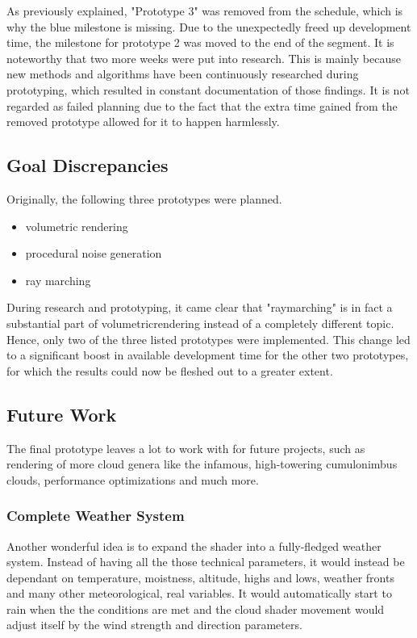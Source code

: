 \vspace{\baselineskip}
\noindent
As previously explained, "Prototype 3" was removed from the schedule, which is why the blue milestone is missing. Due to the unexpectedly freed up development time, the milestone for prototype 2 was moved to the end of the segment.
\emptyline
It is noteworthy that two more weeks were put into research. This is mainly because new methods and algorithms have been continuously researched during prototyping, which resulted in constant documentation of those findings.
It is not regarded as failed planning due to the fact that the extra time gained from the removed prototype allowed for it to happen harmlessly.

\clearpage
\subsection{Goal Discrepancies}
\label{section:projectmanagement:goals}
Originally, the following three prototypes were planned.
\begin{itemize}
    \item volumetric rendering
    \item procedural noise generation
    \item ray marching
\end{itemize}
During research and prototyping, it came clear that "\gls{raymarching}" is in fact a substantial part of \gls{volumetricrendering} instead of a completely different topic.
Hence, only two of the three listed prototypes were implemented. This change led to a significant boost in available development time for the other two prototypes, for which the results could now be fleshed out to a greater extent.

\subsection{Future Work}
The final prototype leaves a lot to work with for future projects, such as rendering of more cloud genera like the infamous, high-towering cumulonimbus clouds, performance optimizations and much more.

\subsubsection{Complete Weather System}
Another wonderful idea is to expand the shader into a fully-fledged weather system. Instead of having all the those technical \gls{parameters}, it would instead be dependant on temperature, moistness, altitude, highs and lows, weather fronts and many other meteorological, real variables.
It would automatically start to rain when the the conditions are met and the cloud shader movement would adjust itself by the wind strength and direction \gls{parameters}.